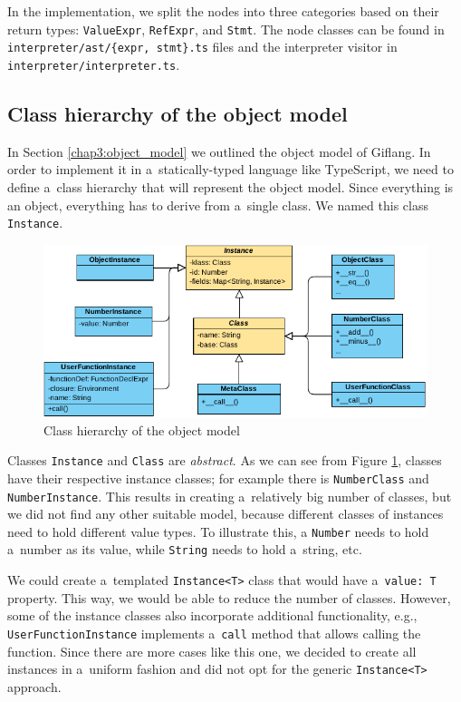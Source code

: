In the implementation, we split the nodes into three categories based on their return types: \texttt{ValueExpr}, \texttt{RefExpr}, and \texttt{Stmt}.
The node classes can be found in \texttt{interpreter/ast/\{expr, stmt\}.ts} files and the interpreter visitor in \texttt{interpreter/interpreter.ts}. 

\subsection{Class hierarchy of the object model}
In Section \ref{chap3:object_model} we outlined the object model of Giflang. In order to implement it in a~statically-typed language like TypeScript, we
need to define a~class hierarchy that will represent the object model. Since everything is an object, everything has to derive from a~single class. We named
this class \texttt{Instance}.
\begin{figure}[!hbt]
	\includegraphics[width=1\textwidth]{../img/class_hierarchy}
    \caption{Class hierarchy of the object model}
	\label{fig:chap4:class_hierarchy}
\end{figure}

Classes \texttt{Instance} and \texttt{Class} are \emph{abstract}. As we can see from Figure \ref{fig:chap4:class_hierarchy}, classes have their
respective instance classes; for example there is \texttt{NumberClass} and \texttt{NumberInstance}. This results in creating a~relatively big number
of classes, but we did not find any other suitable model, because different classes of instances need to hold different value types. To illustrate this,
a \texttt{Number} needs to hold a~number as its value, while \texttt{String} needs to hold a~string, etc.

We could create a~templated \texttt{Instance<T>} class that would have a~\texttt{value: T} property. This way, we would be able to reduce the number of
classes. However, some of the instance classes also incorporate additional functionality, e.g., \texttt{UserFunctionInstance} implements a~\texttt{call} method
that allows calling the function. Since there are more cases like this one, we decided to create all instances in a~uniform fashion and did not opt for the
generic \texttt{Instance<T>} approach.

